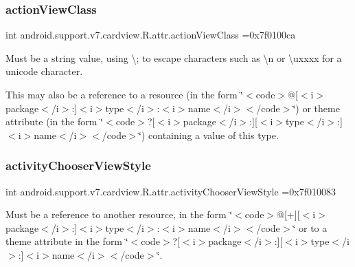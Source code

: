 \subsubsection{\texorpdfstring{action\+View\+Class}{actionViewClass}}
{\footnotesize\ttfamily int android.\+support.\+v7.\+cardview.\+R.\+attr.\+action\+View\+Class =0x7f0100ca\hspace{0.3cm}{\ttfamily [static]}}

Must be a string value, using \textquotesingle{}\textbackslash{};\textquotesingle{} to escape characters such as \textquotesingle{}\textbackslash{}n\textquotesingle{} or \textquotesingle{}\textbackslash{}uxxxx\textquotesingle{} for a unicode character. 

This may also be a reference to a resource (in the form \char`\"{}$<$code$>$@\mbox{[}$<$i$>$package$<$/i$>$\+:\mbox{]}$<$i$>$type$<$/i$>$\+:$<$i$>$name$<$/i$>$$<$/code$>$\char`\"{}) or theme attribute (in the form \char`\"{}$<$code$>$?\mbox{[}$<$i$>$package$<$/i$>$\+:\mbox{]}\mbox{[}$<$i$>$type$<$/i$>$\+:\mbox{]}$<$i$>$name$<$/i$>$$<$/code$>$\char`\"{}) containing a value of this type. \mbox{\label{classandroid_1_1support_1_1v7_1_1cardview_1_1R_1_1attr_a7807051f48f250aef8e6742672cc4ef7}} 
\subsubsection{\texorpdfstring{activity\+Chooser\+View\+Style}{activityChooserViewStyle}}
{\footnotesize\ttfamily int android.\+support.\+v7.\+cardview.\+R.\+attr.\+activity\+Chooser\+View\+Style =0x7f010083\hspace{0.3cm}{\ttfamily [static]}}

Must be a reference to another resource, in the form \char`\"{}$<$code$>$@\mbox{[}+\mbox{]}\mbox{[}$<$i$>$package$<$/i$>$\+:\mbox{]}$<$i$>$type$<$/i$>$\+:$<$i$>$name$<$/i$>$$<$/code$>$\char`\"{} or to a theme attribute in the form \char`\"{}$<$code$>$?\mbox{[}$<$i$>$package$<$/i$>$\+:\mbox{]}\mbox{[}$<$i$>$type$<$/i$>$\+:\mbox{]}$<$i$>$name$<$/i$>$$<$/code$>$\char`\"{}. \mbox{\label{classandroid_1_1support_1_1v7_1_1cardview_1_1R_1_1attr_aa7a3375ee9b48d0c8df6ec49c72d5199}} 
